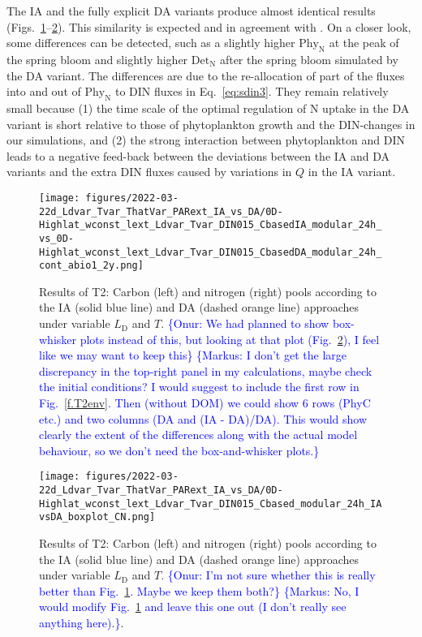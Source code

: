 \documentclass[gmd, manuscript]{copernicus}
\newcommand{\onur}[1]{\textcolor{blue}{\{Onur: #1\}}}
\newcommand{\markus}[1]{\textcolor{blue}{\{Markus: #1\}}}
\begin{document}

The IA and the fully explicit DA variants produce almost identical results (Figs.~\ref{f.T2res}--\ref{f.T2resbox}). This similarity is expected and in agreement with \citet{Ward2017}. On a closer look, some differences can be detected, such as a slightly higher $\text{Phy}_{\text{N}}$ at the peak of the spring bloom and slightly higher $\text{Det}_{\text{N}}$ after the spring bloom simulated by the DA variant.  The differences are due to the re-allocation of part of the fluxes into and out of $\text{Phy}_{\text{N}}$ to DIN fluxes in Eq.~\eqref{eq:sdin3}.  They remain relatively small because (1) the time scale of the optimal regulation of N uptake in the DA variant is short relative to those of phytoplankton growth and the DIN-changes in our simulations, and (2) the strong interaction between phytoplankton and DIN leads to a negative feed-back between the deviations between the IA and DA variants and the extra DIN fluxes caused by variations in $Q$ in the IA variant.

\begin{figure}[htb!]
\texttt{[image: figures/2022-03-22d\_Ldvar\_Tvar\_ThatVar\_PARext\_IA\_vs\_DA/0D-Highlat\_wconst\_lext\_Ldvar\_Tvar\_DIN015\_CbasedIA\_modular\_24h\_vs\_0D-Highlat\_wconst\_lext\_Ldvar\_Tvar\_DIN015\_CbasedDA\_modular\_24h\_cont\_abio1\_2y.png]}
\caption{Results of T2: Carbon (left) and nitrogen (right) pools according to the IA (solid blue line) and DA (dashed orange line) approaches under variable $L_{\text{D}}$ and $T$. \onur{We had planned to show box-whisker plots instead of this, but looking at that plot (Fig.~\ref{f.T2resbox}), I feel like we may want to keep this} \markus{I don't get the large discrepancy in the top-right panel in my calculations, maybe check the initial conditions?  I would suggest to include the first row in Fig.~\ref{f.T2env}.  Then (without DOM) we could show 6 rows (PhyC etc.) and two columns (DA and (IA - DA)/DA).  This would show clearly the extent of the differences along with the actual model behaviour, so we don't need the box-and-whisker plots.}\label{f.T2res}}
\end{figure}

\begin{figure}[htb!]
\texttt{[image: figures/2022-03-22d\_Ldvar\_Tvar\_ThatVar\_PARext\_IA\_vs\_DA/0D-Highlat\_wconst\_lext\_Ldvar\_Tvar\_DIN015\_Cbased\_modular\_24h\_IAvsDA\_boxplot\_CN.png]}
\caption{Results of T2: Carbon (left) and nitrogen (right) pools according to the IA (solid blue line) and DA (dashed orange line) approaches under variable $L_{\text{D}}$ and $T$. \onur{I'm not sure whether this is really better than Fig.~\ref{f.T2res}. Maybe we keep them both?} \markus{No, I would modify Fig.~\ref{f.T2res} and leave this one out (I don't really see anything here).}.\label{f.T2resbox}}
\end{figure}
\end{document}
